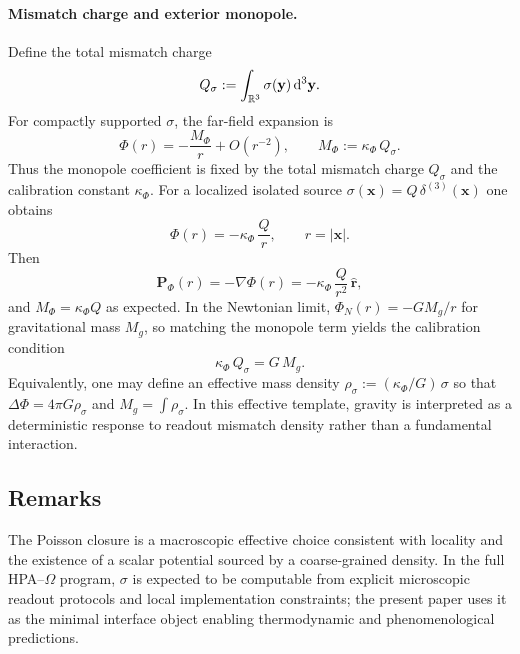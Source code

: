 \paragraph{Mismatch charge and exterior monopole.}
Define the total mismatch charge
\begin{equation}
  Q_\sigma := \int_{\mathbb{R}^3}\sigma(\mathbf{y})\,\mathrm{d}^3\mathbf{y}.
\end{equation}
For compactly supported $\sigma$, the far-field expansion is
\begin{equation}
  \Phi(r) = -\frac{M_\Phi}{r}+O(r^{-2}),
  \qquad
  M_\Phi := \kappa_\Phi\,Q_\sigma.
\end{equation}
Thus the monopole coefficient is fixed by the total mismatch charge $Q_\sigma$ and the calibration constant $\kappa_\Phi$.
For a localized isolated source $\sigma(\mathbf{x}) = Q\,\delta^{(3)}(\mathbf{x})$ one obtains
\begin{equation}
  \Phi(r) = -\kappa_\Phi\,\frac{Q}{r},\qquad r=|\mathbf{x}|.
\end{equation}
Then
\begin{equation}
  \mathbf{P}_\Phi(r) = -\nabla\Phi(r) = -\kappa_\Phi\,\frac{Q}{r^2}\,\hat{\mathbf{r}},
\end{equation}
and $M_\Phi=\kappa_\Phi Q$ as expected.
In the Newtonian limit, $\Phi_N(r)=-G M_g/r$ for gravitational mass $M_g$, so matching the monopole term yields the calibration condition
\begin{equation}
  \kappa_\Phi\,Q_\sigma = G\,M_g.
\label{eq:kappa_phi_calibration}
\end{equation}
Equivalently, one may define an effective mass density $\rho_\sigma := (\kappa_\Phi/G)\,\sigma$ so that $\Delta\Phi=4\pi G\rho_\sigma$ and $M_g=\int\rho_\sigma$.
In this effective template, gravity is interpreted as a deterministic response to readout mismatch density rather than a fundamental interaction.

\subsection{Remarks}

The Poisson closure is a macroscopic effective choice consistent with locality and the existence of a scalar potential sourced by a coarse-grained density. In the full HPA--$\Omega$ program, $\sigma$ is expected to be computable from explicit microscopic readout protocols and local implementation constraints; the present paper uses it as the minimal interface object enabling thermodynamic and phenomenological predictions.

